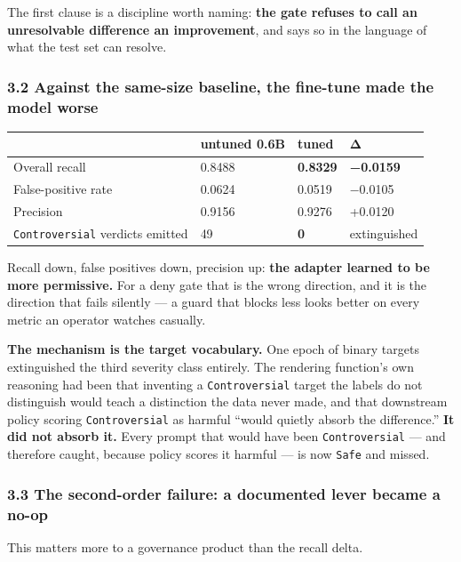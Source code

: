 The first clause is a discipline worth naming: \textbf{the gate refuses to call an unresolvable difference
an improvement}, and says so in the language of what the test set can resolve.

\subsubsection{3.2 Against the same-size baseline, the fine-tune made the model worse}\label{against-the-same-size-baseline-the-fine-tune-made-the-model-worse}

\begin{longtable}[]{@{}llll@{}}
\toprule\noalign{}
& untuned 0.6B & tuned & Δ \\
\midrule\noalign{}
\endhead
\bottomrule\noalign{}
\endlastfoot
Overall recall & 0.8488 & \textbf{0.8329} & \textbf{−0.0159} \\
False-positive rate & 0.0624 & 0.0519 & −0.0105 \\
Precision & 0.9156 & 0.9276 & +0.0120 \\
\texttt{Controversial} verdicts emitted & 49 & \textbf{0} & extinguished \\
\end{longtable}

Recall down, false positives down, precision up: \textbf{the adapter learned to be more permissive.} For a
deny gate that is the wrong direction, and it is the direction that fails silently --- a guard that
blocks less looks better on every metric an operator watches casually.

\textbf{The mechanism is the target vocabulary.} One epoch of binary targets extinguished the third
severity class entirely. The rendering function's own reasoning had been that inventing a
\texttt{Controversial} target the labels do not distinguish would teach a distinction the data never made,
and that downstream policy scoring \texttt{Controversial} as harmful ``would quietly absorb the difference.''
\textbf{It did not absorb it.} Every prompt that would have been \texttt{Controversial} --- and therefore caught,
because policy scores it harmful --- is now \texttt{Safe} and missed.

\subsubsection{3.3 The second-order failure: a documented lever became a no-op}\label{the-second-order-failure-a-documented-lever-became-a-no-op}

This matters more to a governance product than the recall delta.

